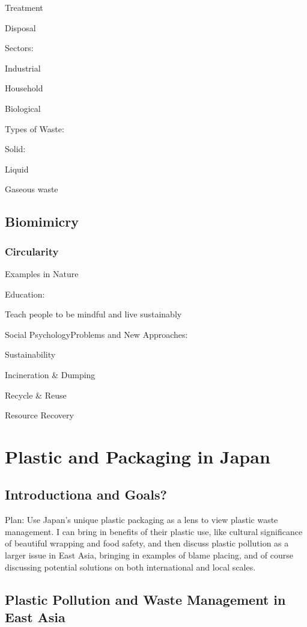 \documentclass{book}\usepackage{knitr}
\begin{document}
{Treatment

Disposal

Sectors:

Industrial

Household

Biological 

Types of Waste:

Solid:

Liquid

Gaseous waste

\section{Biomimicry}

\subsection{Circularity}

Examples in Nature

Education:

Teach people to be mindful and live sustainably

Social PsychologyProblems and New Approaches: 

Sustainability

Incineration \& Dumping

Recycle \& Reuse

Resource Recovery


\chapter{Plastic and Packaging in Japan}

\section{Introductiona and Goals?}

Plan: Use Japan's unique plastic packaging as a lens to view plastic waste management. I can bring in benefits of their plastic use, like cultural significance of beautiful wrapping and food safety, and then discuss plastic pollution as a larger issue in East Asia, bringing in examples of blame placing, and of course discussing potential solutions on both international and local scales. 

\section{Plastic Pollution and Waste Management in East Asia} 

}
\end{document}
